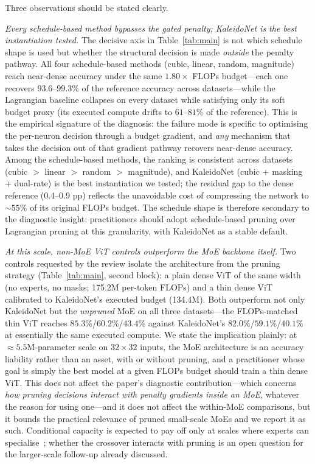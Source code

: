 \documentclass[fleqn,10pt]{article}
\begin{document}
Three observations should be stated clearly.

\textit{Every schedule-based method bypasses the gated penalty;
KaleidoNet is the best instantiation tested.} The decisive
axis in Table~\ref{tab:main} is not which schedule shape is used but
whether the structural decision is made \emph{outside} the penalty
pathway. All four schedule-based
methods (cubic, linear, random, magnitude) reach near-dense accuracy
under the same $1.80\times$ FLOPs budget---each one recovers
$93.6$--$99.3\%$ of the reference accuracy across datasets---while the
Lagrangian baseline collapses on every dataset while satisfying
only its soft budget proxy (its executed compute drifts to
$61$--$81\%$ of the reference). This is the empirical signature of the diagnosis:
the failure mode is specific to optimising the per-neuron decision
through a budget gradient, and \emph{any} mechanism that takes the
decision out of that gradient pathway recovers near-dense accuracy.
Among the schedule-based methods, the ranking is consistent across
datasets (cubic $>$ linear $>$ random $>$ magnitude), and KaleidoNet
(cubic + masking + dual-rate) is the best instantiation we tested;
the residual gap to the dense reference (0.4--0.9 pp) reflects the
unavoidable cost of compressing the network to ${\sim}55\%$ of its
original FLOPs budget. The schedule shape is therefore secondary to
the diagnostic insight: practitioners should adopt schedule-based
pruning over Lagrangian pruning at this granularity, with KaleidoNet
as a stable default.

\textit{At this scale, non-MoE ViT controls outperform the MoE
backbone itself.} Two controls requested by the review isolate the
architecture from the pruning strategy (Table~\ref{tab:main}, second
block): a plain dense ViT of the same width (no experts, no masks;
175.2M per-token FLOPs) and a thin dense ViT calibrated to
KaleidoNet's executed budget (134.4M). Both outperform not only
KaleidoNet but the \emph{unpruned} MoE on all three datasets---the
FLOPs-matched thin ViT reaches $85.3\%$/$60.2\%$/$43.4\%$ against
KaleidoNet's $82.0\%$/$59.1\%$/$40.1\%$ at essentially the same
executed compute. We state the implication plainly: at
${\approx}5.5$M-parameter scale on $32{\times}32$ inputs, the MoE
architecture is an accuracy liability rather than an asset, with or
without pruning, and a practitioner whose goal is simply the best
model at a given FLOPs budget should train a thin dense ViT. This
does not affect the paper's diagnostic contribution---which concerns
\emph{how pruning decisions interact with penalty gradients inside
an MoE}, whatever the reason for using one---and it does not affect
the within-MoE comparisons, but it bounds the practical relevance
of pruned small-scale MoEs and we report it as such. Conditional
capacity is expected to pay off only at scales where experts can
specialise~\citep{fedus2022switch,riquelme2021scaling}; whether the
crossover interacts with pruning is an open question for the
larger-scale follow-up already discussed.
\end{document}
